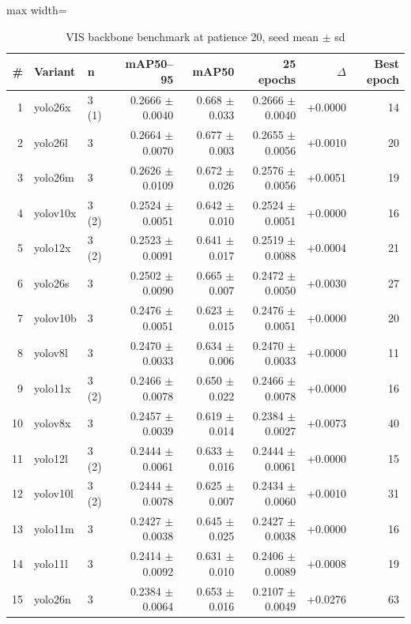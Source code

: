 \documentclass[journal,onecolumn]{IEEEtran}
\begin{document}
\begin{table}[htbp]
\centering
\footnotesize
\caption{VIS backbone benchmark at patience 20, seed mean $\pm$ sd}
\label{tab:18}
\setlength{\tabcolsep}{3pt}
\begin{adjustbox}{max width=\linewidth}
\begin{tabular}{rllrrrrr}
\toprule
\# & Variant & n & mAP50--95 & mAP50 & 25 epochs & $\Delta$ & Best epoch \\
\midrule
1 & yolo26x & 3 (1\textdagger{}) & 0.2666 $\pm$ 0.0040 & 0.668 $\pm$ 0.033 & 0.2666 $\pm$ 0.0040 & +0.0000 & 14 \\
2 & yolo26l & 3 & 0.2664 $\pm$ 0.0070 & 0.677 $\pm$ 0.003 & 0.2655 $\pm$ 0.0056 & +0.0010 & 20 \\
3 & yolo26m & 3 & 0.2626 $\pm$ 0.0109 & 0.672 $\pm$ 0.026 & 0.2576 $\pm$ 0.0056 & +0.0051 & 19 \\
4 & yolov10x & 3 (2\textdagger{}) & 0.2524 $\pm$ 0.0051 & 0.642 $\pm$ 0.010 & 0.2524 $\pm$ 0.0051 & +0.0000 & 16 \\
5 & yolo12x & 3 (2\textdagger{}) & 0.2523 $\pm$ 0.0091 & 0.641 $\pm$ 0.017 & 0.2519 $\pm$ 0.0088 & +0.0004 & 21 \\
6 & yolo26s & 3 & 0.2502 $\pm$ 0.0090 & 0.665 $\pm$ 0.007 & 0.2472 $\pm$ 0.0050 & +0.0030 & 27 \\
7 & yolov10b & 3 & 0.2476 $\pm$ 0.0051 & 0.623 $\pm$ 0.015 & 0.2476 $\pm$ 0.0051 & +0.0000 & 20 \\
8 & yolov8l & 3 & 0.2470 $\pm$ 0.0033 & 0.634 $\pm$ 0.006 & 0.2470 $\pm$ 0.0033 & +0.0000 & 11 \\
9 & yolo11x & 3 (2\textdagger{}) & 0.2466 $\pm$ 0.0078 & 0.650 $\pm$ 0.022 & 0.2466 $\pm$ 0.0078 & +0.0000 & 16 \\
10 & yolov8x & 3 & 0.2457 $\pm$ 0.0039 & 0.619 $\pm$ 0.014 & 0.2384 $\pm$ 0.0027 & +0.0073 & 40 \\
11 & yolo12l & 3 (2\textdagger{}) & 0.2444 $\pm$ 0.0061 & 0.633 $\pm$ 0.016 & 0.2444 $\pm$ 0.0061 & +0.0000 & 15 \\
12 & yolov10l & 3 (2\textdagger{}) & 0.2444 $\pm$ 0.0078 & 0.625 $\pm$ 0.007 & 0.2434 $\pm$ 0.0060 & +0.0010 & 31 \\
13 & yolo11m & 3 & 0.2427 $\pm$ 0.0038 & 0.645 $\pm$ 0.025 & 0.2427 $\pm$ 0.0038 & +0.0000 & 16 \\
14 & yolo11l & 3 & 0.2414 $\pm$ 0.0092 & 0.631 $\pm$ 0.010 & 0.2406 $\pm$ 0.0089 & +0.0008 & 19 \\
15 & yolo26n & 3 & 0.2384 $\pm$ 0.0064 & 0.653 $\pm$ 0.016 & 0.2107 $\pm$ 0.0049 & +0.0276 & 63 \\

\end{tabular}
\end{adjustbox}
\end{table}
\end{document}
